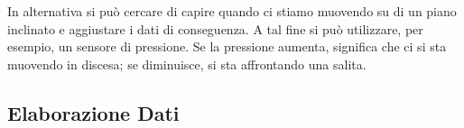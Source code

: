 \documentclass[12pt, a4paper]{article}
\begin{document}
	In alternativa si può cercare di capire quando ci stiamo muovendo su di un piano inclinato e aggiustare i dati di conseguenza. A tal fine si può utilizzare, per esempio, un sensore di pressione. Se la pressione aumenta, significa che ci si sta muovendo in discesa; se diminuisce, si sta affrontando una salita.
	
	
	\subsection{Elaborazione Dati}
	
	
	
	
%		
	
\end{document}
